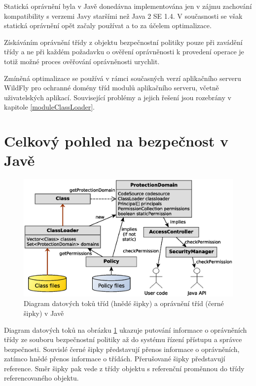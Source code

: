 Statická oprávnění byla v Javě donedávna implementována jen v zájmu zachování kompatibility s verzemi Javy staršími než Java 2 SE 1.4. \cite{sourceProtectionDomain}
V současnosti se však statická oprávnění opět začaly používat a to za účelem optimalizace.

Získáváním oprávnění třídy z objektu bezpečnostní politiky pouze při zavádění třídy a ne při každém požadavku o ověření oprávněnosti k provedení operace je totiž možné proces ověřování oprávněnosti urychlit.

Zmíněná optimalizace se používá v rámci současných verzí aplikačního serveru WildFly pro ochranné domény tříd modulů aplikačního serveru, včetně uživatelských aplikací. Související problémy a jejich řešení jsou rozebrány v kapitole \ref{moduleClassLoader}.

\section{Celkový pohled na bezpečnost v Javě}

\begin{figure}[ht]
  \centering
  \includegraphics[width=14cm]{fig/domain-schema}
  \caption{Diagram datových toků tříd (hnědé šipky) a oprávnění tříd (černé šipky) v Javě}
  \label{diagramDatovychToku}
\end{figure}

Diagram datových toků na obrázku \ref{diagramDatovychToku} ukazuje putování informace o oprávněních třídy ze souboru bezpečnostní politiky až do systému řízení přístupu a správce bezpečnosti. Souvislé černé šipky představují přenos informace o oprávněních, zatímco hnědé přenos informace o třídách. Přerušované šipky představují reference. Směr šipky pak vede z třídy objektu s referenční proměnnou do třídy referencovaného objektu.

